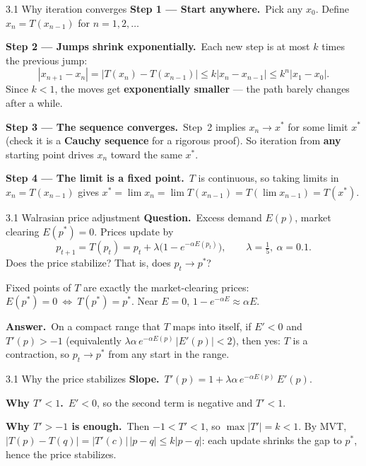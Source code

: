 \documentclass[11pt,aspectratio=169]{beamer}
\begin{document}
\begin{frame}{3.1 Why iteration converges}
  \footnotesize
  \textbf{Step 1 --- Start anywhere.}\
  Pick any $x_0$. Define $x_n=T(x_{n-1})$ for $n=1,2,\ldots$

  \medskip
  \textbf{Step 2 --- Jumps shrink exponentially.}\
  Each new step is at most $k$ times the previous jump:
  \[
    |x_{n+1}-x_n|=|T(x_n)-T(x_{n-1})|\le k|x_n-x_{n-1}|\le k^n|x_1-x_0|.
  \]
  Since $k<1$, the moves get \textbf{exponentially smaller} --- the path barely changes after a while.

  \medskip
  \textbf{Step 3 --- The sequence converges.}\
  Step~2 implies $x_n\to x^*$ for some limit $x^*$
  (check it is a \textbf{Cauchy sequence} for a rigorous proof).
  So iteration from \textbf{any} starting point drives $x_n$ toward the same $x^*$.

  \medskip
  \textbf{Step 4 --- The limit is a fixed point.}\
  $T$ is continuous, so taking limits in $x_n=T(x_{n-1})$ gives
  $x^*=\lim x_n=\lim T(x_{n-1})=T(\lim x_{n-1})=T(x^*)$.
\end{frame}

\begin{frame}{3.1 Walrasian price adjustment}
  \footnotesize
  \textbf{Question.}\ Excess demand $E(p)$, market clearing $E(p^*)=0$.
  Prices update by
  \[
    p_{t+1}=T(p_t)=p_t+\lambda\bigl(1-e^{-\alpha E(p_t)}\bigr),
    \qquad \lambda=\tfrac15,\ \alpha=0.1.
  \]
  Does the price stabilize? That is, does $p_t\to p^*$?

  \medskip
  Fixed points of $T$ are exactly the market-clearing prices:
  $E(p^*)=0\ \Leftrightarrow\ T(p^*)=p^*$.
  Near $E=0$, $1-e^{-\alpha E}\approx\alpha E$.

  \medskip
  \textbf{Answer.}\ On a compact range that $T$ maps into itself, if
  $E'<0$ and $T'(p)>-1$
  (equivalently $\lambda\alpha\,e^{-\alpha E(p)}\,|E'(p)|<2$),
  then yes: $T$ is a contraction, so $p_t\to p^*$ from any start in the range.
\end{frame}

\begin{frame}{3.1 Why the price stabilizes}
  \footnotesize
  \textbf{Slope.}\
  $T'(p)=1+\lambda\alpha\,e^{-\alpha E(p)}\,E'(p)$.

  \medskip
  \textbf{Why $T'<1$.}\ $E'<0$, so the second term is negative and $T'<1$.

  \medskip
  \textbf{Why $T'>-1$ is enough.}\ Then $-1<T'<1$, so $\max|T'|=k<1$.
  By MVT, $|T(p)-T(q)|=|T'(c)|\,|p-q|\le k|p-q|$:
  each update shrinks the gap to $p^*$, hence the price stabilizes.
\end{frame}
\end{document}
